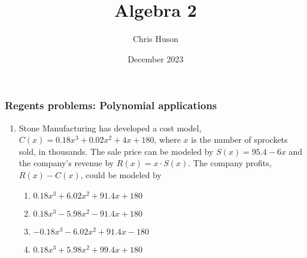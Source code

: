 \documentclass[12pt, twoside]{article}
\title{Algebra 2}
\author{Chris Huson}
\date{December 2023}
\begin{document}
\subsubsection*{Regents problems: Polynomial applications}
\begin{enumerate}[itemsep=0.5cm]

\item Stone Manufacturing has developed a cost model, $C(x) = 0.18x^3 + 0.02x^2 + 4x + 180$, where $x$ is the number of sprockets sold, in thousands. The sale price can be modeled by $S(x) = 95.4 - 6x$ and the company’s revenue by $R(x) = x \cdot S(x)$. The company profits, $R(x) - C(x)$, could be modeled by %
\begin{enumerate}
    \item $0.18x^3 + 6.02x^2 + 91.4x + 180$
    \item $0.18x^3 - 5.98x^2 - 91.4x + 180$
    \item $-0.18x^3 - 6.02x^2 + 91.4x - 180$
    \item $0.18x^3 + 5.98x^2 + 99.4x + 180$
\end{enumerate}

\end{enumerate}
\end{document}
